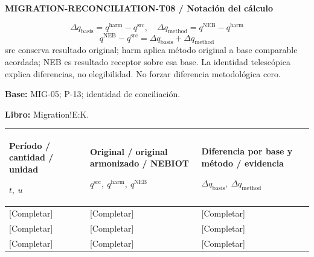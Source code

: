 \par\begingroup\sffamily\fontsize{8}{10}\selectfont\color{NEBGreen}\setlength{\parskip}{2pt}\setlength{\abovedisplayskip}{4pt}\setlength{\belowdisplayskip}{4pt}\setlength{\abovedisplayshortskip}{2pt}\setlength{\belowdisplayshortskip}{3pt}
\textbf{MIGRATION-RECONCILIATION-T08 / Notación del cálculo}\par
{\fontsize{9}{11}\selectfont\[ \Delta q_{\mathrm{basis}}=q^{\mathrm{harm}}-q^{\mathrm{src}},\quad \Delta q_{\mathrm{method}}=q^{\mathrm{NEB}}-q^{\mathrm{harm}} \]}
{\fontsize{9}{11}\selectfont\[ q^{\mathrm{NEB}}-q^{\mathrm{src}}=\Delta q_{\mathrm{basis}}+\Delta q_{\mathrm{method}} \]}
src conserva resultado original; harm aplica método original a base comparable acordada; NEB es resultado receptor sobre esa base. La identidad telescópica explica diferencias, no elegibilidad. No forzar diferencia metodológica cero.\par
\textbf{Base:} MIG-05; P-13; identidad de conciliación.\par
\textbf{Libro:} Migration!E:K.\par\endgroup
{\sffamily\fontsize{8.3}{10.3}\selectfont\begin{longtable}{@{}P{54.83mm} P{54.83mm} P{54.83mm}@{}}
\toprule
\textbf{Período / cantidad / unidad}\par {\normalfont\fontsize{8.2}{10}\selectfont $t,\ u$} & \textbf{Original / original armonizado / NEBIOT}\par {\normalfont\fontsize{8.2}{10}\selectfont $q^{\mathrm{src}},\ q^{\mathrm{harm}},\ q^{\mathrm{NEB}}$} & \textbf{Diferencia por base y método / evidencia}\par {\normalfont\fontsize{8.2}{10}\selectfont $\Delta q_{\mathrm{basis}},\ \Delta q_{\mathrm{method}}$}\\\midrule\endhead
\rule{0pt}{8mm}[Completar] & [Completar] & [Completar]\\\hline
\rule{0pt}{8mm}[Completar] & [Completar] & [Completar]\\\hline
\rule{0pt}{8mm}[Completar] & [Completar] & [Completar]\\\hline
\end{longtable}}
